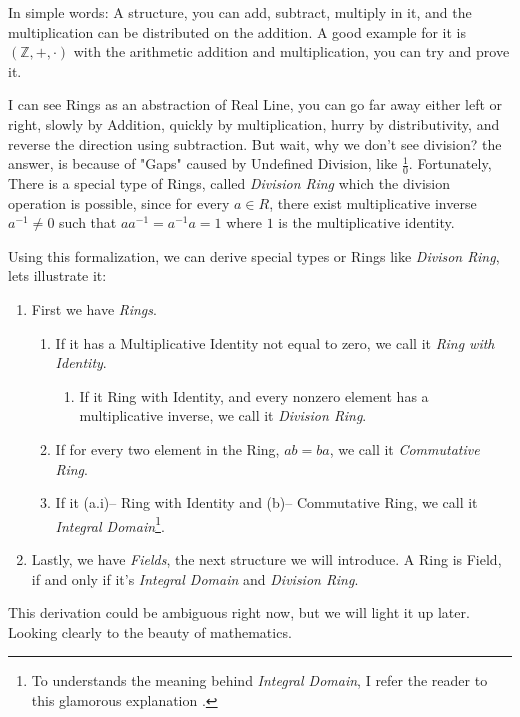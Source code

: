 In simple words: A structure, you can add, subtract, multiply in it, and the multiplication can be distributed on the addition. A good example for it is $(\mathbb{Z},+,\cdot)$ with the arithmetic addition and multiplication, you can try and prove it.

I can see Rings as an abstraction of Real Line, you can go far away either left or right, slowly by Addition, quickly by multiplication, hurry by distributivity,  and reverse the direction using subtraction. But wait, why we don't see division? the answer, is because of "Gaps" caused by Undefined Division, like $\frac{1}{0}$. Fortunately, There is a special type of Rings, called {\it Division Ring} which the division operation is possible, since for every $a \in R$, there exist multiplicative inverse $a^{-1} \neq 0$ such that $aa^{-1}=a^{-1}a=1$ where $1$ is the multiplicative identity.

Using this formalization, we can derive special types or Rings like {\it Divison Ring}, lets illustrate it: \begin{enumerate}
    \item First we have {\it Rings}.
    \begin{enumerate}
        \item If it has a Multiplicative Identity not equal to zero, we call it {\it Ring with Identity}.
            \begin{enumerate}
                \item If it Ring with Identity, and every nonzero element has a multiplicative inverse, we call it {\it Division Ring}. 
            \end{enumerate}
        \item If for every two element in the Ring, $ab=ba$, we call it {\it Commutative Ring}.
        \item If it (a.i)-- Ring with Identity and (b)-- Commutative Ring, we call it {\it Integral Domain}\footnote{To understands the meaning behind {\it Integral Domain}, I refer the reader to this glamorous explanation \cite{46944}.}.
    \end{enumerate}
    \item Lastly, we have {\it Fields}, the next structure we will introduce. A Ring is Field, if and only if it's {\it Integral Domain} and {\it Division Ring}.
\end{enumerate}

This derivation could be ambiguous right now, but we will light it up later. Looking clearly to the beauty of mathematics.